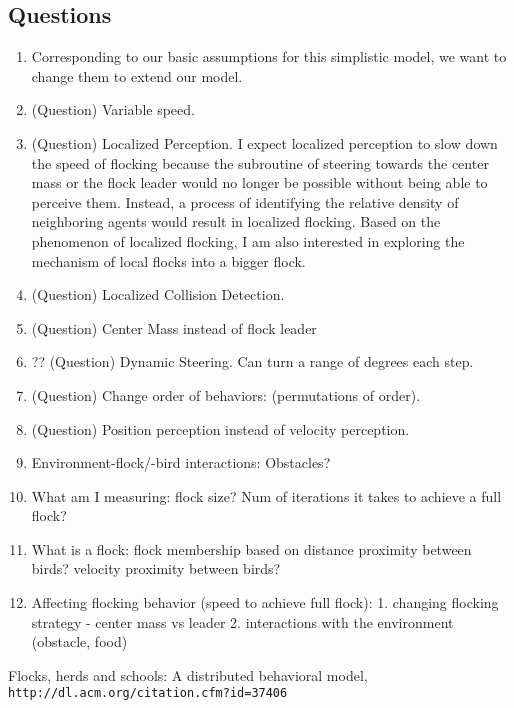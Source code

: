 \documentclass{article}
\begin{document}
\subsection{Questions}

  \begin{enumerate}
    \item [] Corresponding to our basic assumptions for this simplistic model,
      we want to change them to extend our model.

    \item (Question) Variable speed.

    \item (Question) Localized Perception. I expect localized perception to slow down
      the speed of flocking because the subroutine of steering towards the
      center mass or the flock leader would no longer be possible without being
      able to perceive them. Instead, a process of identifying the relative
      density of neighboring agents would result in localized flocking. Based
      on the phenomenon of localized flocking, I am also interested in exploring
      the mechanism of local flocks into a bigger flock.

    \item (Question) Localized Collision Detection.

    \item (Question) Center Mass instead of flock leader

    \item ?? (Question) Dynamic Steering. Can turn a range of degrees each step.

    \item (Question) Change order of behaviors: (permutations of order).

    \item (Question) Position perception instead of velocity perception.

    \item Environment-flock/-bird interactions: Obstacles?

    \item What am I measuring: flock size? Num of iterations it takes to achieve a full flock?

    \item What is a flock: flock membership based on distance proximity between birds?
      velocity proximity between birds?

    \item
      Affecting flocking behavior (speed to achieve full flock):
      1. changing flocking strategy - center mass vs leader
      2. interactions with the environment (obstacle, food)

  \end{enumerate}



\begin{thebibliography}{9}
Flocks, herds and schools: A distributed behavioral model,
\\\texttt{http://dl.acm.org/citation.cfm?id=37406}
\end{thebibliography}
\end{document}
